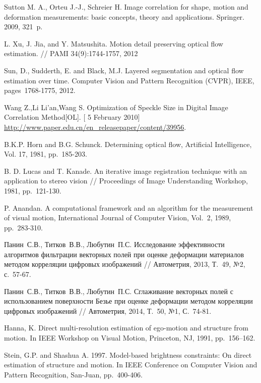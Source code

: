\documentclass[a4paper]{jctart10}
\begin{document}
\begin{thebibliography}{99}

		  {\sc Sutton M. A., Orteu J.-J., Schreier H.} Image correlation for shape, motion and deformation measurements: basic concepts, theory and applications. Springer. 2009, 321~p.
		
			 {\sc L. Xu, J. Jia, and Y. Matsushita.} Motion detail preserving optical flow estimation. // PAMI 34(9):1744-1757, 2012

		   {\sc Sun, D., Sudderth, E. and Black, M.J.} Layered segmentation and optical flow estimation over time. Computer Vision and Pattern Recognition (CVPR), IEEE, pages~1768-1775, 2012.
		
			 {\sc Wang Z.,Li Li’an,Wang S.} Optimization of Speckle Size in Digital Image Correlation Method[OL]. [ 5 February 2010] \url{http://www.paper.edu.cn/en_releasepaper/content/39956}.
		
			  {\sc B.K.P. Horn and B.G. Schunck.} Determining optical flow, Artificial Intelligence, Vol. 17, 1981, pp.~185-203.
		
		  {\sc B. D. Lucas and T. Kanade.} An iterative image registration technique with an application to stereo vision // Proceedings of Image Understanding Workshop, 1981, pp.~121-130.
		
		  {\sc P. Anandan. } A computational framework and an algorithm for the measurement of visual motion, International Journal of Computer Vision, Vol.~2, 1989, pp.~283-310.
		
		  {\sc Панин~С.В., Титков~В.В., Любутин~П.С.} Исследование эффективности алгоритмов фильтрации векторных полей при оценке деформации материалов методом корреляции цифровых изображений // Автометрия, 2013, Т.~49, №2, с.~57-67.
		
		  {\sc Панин~С.В., Титков~В.В., Любутин~П.С.} Сглаживание векторных полей с использованием поверхности Безье при оценке деформации методом корреляции цифровых изображений // Автометрия, 2014, Т.~50, №1, С.~74-81.
		
		  {\sc Hanna, K.} Direct multi-resolution estimation of ego-motion and structure from motion. In IEEE Workshop on Visual Motion, Princeton, NJ, 1991, pp.~156–162.
		
		  {\sc Stein, G.P. and Shashua A.} 1997. Model-based brightness constraints: On direct estimation of structure and motion. In IEEE Conference on Computer Vision and Pattern Recognition, San-Juan, pp.~400-406.
		

\end{thebibliography}
\end{document}
